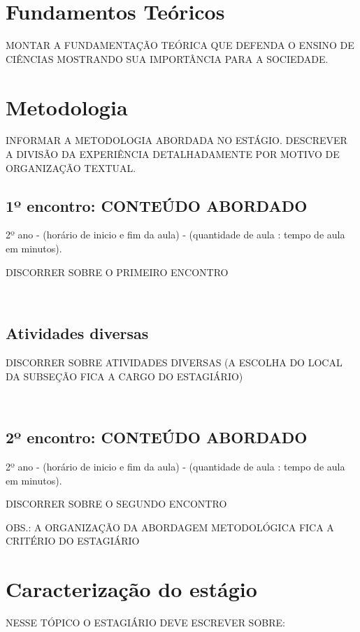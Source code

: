\documentclass[a4paper, 12 pt]{article}                                	%
\begin{document}
	\section{Fundamentos Teóricos}
	
	
	MONTAR A FUNDAMENTAÇÃO TEÓRICA QUE DEFENDA O ENSINO DE CIÊNCIAS MOSTRANDO SUA IMPORTÂNCIA PARA A SOCIEDADE.
	
	
	\section{Metodologia}
	\label{sec:metodologia}
	
	INFORMAR A METODOLOGIA ABORDADA NO ESTÁGIO. DESCREVER A DIVISÃO DA EXPERIÊNCIA DETALHADAMENTE POR MOTIVO DE ORGANIZAÇÃO TEXTUAL.
	
	\subsection{1º encontro: CONTEÚDO ABORDADO} 2º ano - (horário de inicio e fim da aula) - (quantidade de aula : tempo de aula em minutos).
	
	DISCORRER SOBRE O PRIMEIRO ENCONTRO  
	
	
	\
	\subsection{Atividades diversas}
	
	DISCORRER SOBRE ATIVIDADES DIVERSAS (A ESCOLHA DO LOCAL DA SUBSEÇÃO FICA A CARGO DO ESTAGIÁRIO)
	
	\
	\subsection{2º encontro: CONTEÚDO ABORDADO} 2º ano - (horário de inicio e fim da aula) - (quantidade de aula : tempo de aula em minutos).
	
	DISCORRER SOBRE O SEGUNDO ENCONTRO 
	
	OBS.: A ORGANIZAÇÃO DA ABORDAGEM METODOLÓGICA FICA A CRITÉRIO DO ESTAGIÁRIO
	
	\newpage
	\section{Caracterização do estágio}
	
	NESSE TÓPICO O ESTAGIÁRIO DEVE ESCREVER SOBRE:
	
\end{document}

